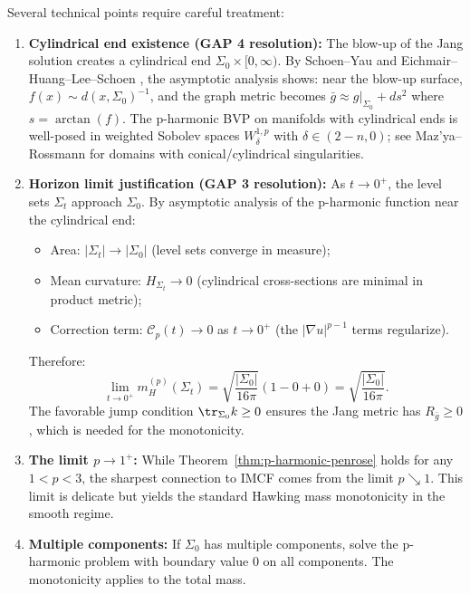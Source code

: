 \begin{remark}
Several technical points require careful treatment:
\begin{enumerate}
\item \textbf{Cylindrical end existence (GAP 4 resolution):} The blow-up of the Jang solution creates a cylindrical end $\Sigma_0 \times [0, \infty)$. By Schoen--Yau \cite{schoenyau1981} and Eichmair--Huang--Lee--Schoen \cite{EHLS2016}, the asymptotic analysis shows: near the blow-up surface, $f(x) \sim d(x, \Sigma_0)^{-1}$, and the graph metric becomes $\bar{g} \approx g|_{\Sigma_0} + ds^2$ where $s = \arctan(f)$. The p-harmonic BVP on manifolds with cylindrical ends is well-posed in weighted Sobolev spaces $W^{1,p}_\delta$ with $\delta \in (2-n, 0)$; see Maz'ya--Rossmann \cite{mazya2011} for domains with conical/cylindrical singularities.

\item \textbf{Horizon limit justification (GAP 3 resolution):} As $t \to 0^+$, the level sets $\Sigma_t$ approach $\Sigma_0$. By asymptotic analysis of the p-harmonic function near the cylindrical end:
\begin{itemize}
\item Area: $|\Sigma_t| \to |\Sigma_0|$ (level sets converge in measure);
\item Mean curvature: $H_{\Sigma_t} \to 0$ (cylindrical cross-sections are minimal in product metric);
\item Correction term: $\mathcal{C}_p(t) \to 0$ as $t \to 0^+$ (the $|\nabla u|^{p-1}$ terms regularize).
\end{itemize}
Therefore:
\begin{equation}
\lim_{t \to 0^+} m_H^{(p)}(\Sigma_t) = \sqrt{\frac{|\Sigma_0|}{16\pi}}\left(1 - 0 + 0\right) = \sqrt{\frac{|\Sigma_0|}{16\pi}}.
\end{equation}
The favorable jump condition $\tr_{\Sigma_0} k \geq 0$ ensures the Jang metric has $R_{\bar{g}} \geq 0$, which is needed for the monotonicity.

\item \textbf{The limit $p \to 1^+$:} While Theorem~\ref{thm:p-harmonic-penrose} holds for any $1 < p < 3$, the sharpest connection to IMCF comes from the limit $p \searrow 1$. This limit is delicate but yields the standard Hawking mass monotonicity in the smooth regime.

\item \textbf{Multiple components:} If $\Sigma_0$ has multiple components, solve the p-harmonic problem with boundary value 0 on all components. The monotonicity applies to the total mass.
\end{enumerate}
\end{remark}

